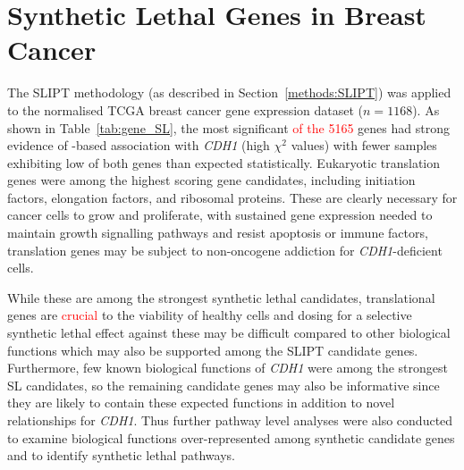 \section{Synthetic Lethal Genes in Breast Cancer} \label{chapt3:exprSL_genes}

The \gls{SLIPT} methodology (as described in Section~\ref{methods:SLIPT}) was applied to the normalised \gls{TCGA} breast cancer \gls{gene expression} dataset ($n = 1168$). As shown in Table~\ref{tab:gene_SL}, the most significant \textcolor{red}{of the 5165} genes had strong evidence of -based association with \textit{CDH1} (high $\chi^2$ values) with fewer samples exhibiting low  of both genes than expected statistically. Eukaryotic translation genes were among the highest scoring gene candidates, including initiation factors, elongation factors, and ribosomal proteins. These are clearly necessary for cancer cells to grow and proliferate, with sustained \gls{gene expression} needed to maintain growth signalling \glspl{pathway} and resist apoptosis or immune factors, translation genes may be subject to \gls{non-oncogene addiction} for \textit{CDH1}-deficient cells.

While these are among the strongest \gls{synthetic lethal} candidates, translational genes are \textcolor{red}{crucial} to the viability of healthy cells and dosing for a selective \gls{synthetic lethal} effect against these may be difficult compared to other biological functions which may also be supported among the \gls{SLIPT} candidate genes. Furthermore, few known biological functions of \textit{CDH1} were among the strongest SL candidates, so the remaining candidate genes may also be informative since they are likely to contain these expected functions in addition to novel relationships for \textit{CDH1}. Thus further \gls{pathway} level analyses were also conducted to examine biological functions over-represent\-ed among synthetic candidate genes and to identify \gls{synthetic lethal} \glspl{pathway}.

